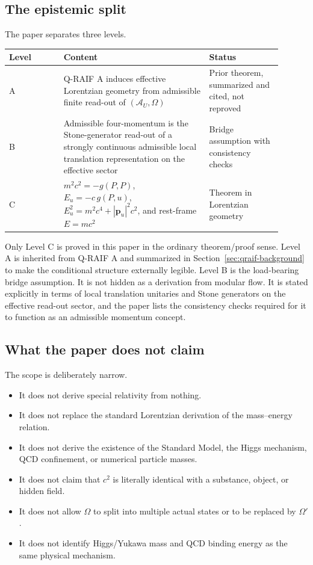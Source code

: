 \documentclass[12pt,a4paper]{article}
\theoremstyle{definition}
\theoremstyle{remark}
\newcommand{\AU}{\mathcal{A}_U}
\newcommand{\Omegastate}{\Omega}
\newcommand{\tightlist}{%
  \setlength{\itemsep}{0pt}\setlength{\parskip}{0pt}}
\begin{document}
\subsection{The epistemic split}

The paper separates three levels.

\begin{center}
\begin{tabular}{P{0.18\linewidth}P{0.48\linewidth}P{0.24\linewidth}}
\toprule
\textbf{Level} & \textbf{Content} & \textbf{Status} \\
\midrule
A & Q-RAIF A induces effective Lorentzian geometry from admissible finite read-out of $(\AU,\Omegastate)$ & Prior theorem, summarized and cited, not reproved \\
B & Admissible four-momentum is the Stone-generator read-out of a strongly continuous admissible local translation representation on the effective sector & Bridge assumption with consistency checks \\
C & $m^2c^2=-g(P,P)$, $E_u=-c\,g(P,u)$, $E_u^2=m^2c^4+|\mathbf p_u|^2c^2$, and rest-frame $E=mc^2$ & Theorem in Lorentzian geometry \\
\bottomrule
\end{tabular}
\end{center}

Only Level C is proved in this paper in the ordinary theorem/proof sense. Level A is inherited from Q-RAIF A and summarized in Section~\ref{sec:qraif-background} to make the conditional structure externally legible. Level B is the load-bearing bridge assumption. It is not hidden as a derivation from modular flow. It is stated explicitly in terms of local translation unitaries and Stone generators on the effective read-out sector, and the paper lists the consistency checks required for it to function as an admissible momentum concept.

\subsection{What the paper does not claim}

The scope is deliberately narrow.

\begin{itemize}[leftmargin=*]
\tightlist
\item It does not derive special relativity from nothing.
\item It does not replace the standard Lorentzian derivation of the mass--energy relation.
\item It does not derive the existence of the Standard Model, the Higgs mechanism, QCD confinement, or numerical particle masses.
\item It does not claim that $c^2$ is literally identical with a substance, object, or hidden field.
\item It does not allow $\Omegastate$ to split into multiple actual states or to be replaced by $\Omegastate'$.
\item It does not identify Higgs/Yukawa mass and QCD binding energy as the same physical mechanism.
\end{itemize}
\end{document}
